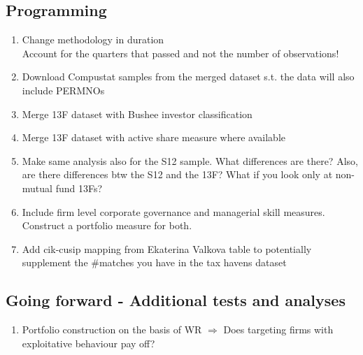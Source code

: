 \documentclass[11pt,a4paper,paranthesis]{article}
\begin{document}
\subsection{Programming}
\begin{enumerate} [leftmargin=*]
	\item Change methodology in duration \\ 
	Account for the quarters that passed and not the number of observations!
	\item Download Compustat samples from the merged dataset s.t. the data will also include PERMNOs
	\item Merge 13F dataset with Bushee investor classification
	\item Merge 13F dataset with active share measure where available
	\item Make same analysis also for the S12 sample. What differences are there? Also, are there differences btw the S12 and the 13F? What if you look only at non-mutual fund 13Fs?
	\item Include firm level corporate governance and managerial skill measures. Construct a portfolio measure for both.
	\item Add cik-cusip mapping from Ekaterina Valkova table to potentially supplement the \#matches you have in the tax havens dataset
\end{enumerate}

\subsection{Going forward - Additional tests and analyses}
\begin{enumerate} [leftmargin=*]
	\item Portfolio construction on the basis of WR $\Rightarrow$ Does targeting firms with exploitative behaviour pay off?
\end{enumerate}

\end{document}
